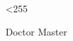 
\makeatletter
{}
\loop \catcode{} \ifnum\@tempcnta<255 \advance \@tempcnta \@ne
\repeat
\makeatother

\newif\ifxueweidoctor %
\newif\ifxueweimaster
\def\temp{Doctor}
\ifx\temp\xuewei
  \xueweidoctortrue  \xueweimasterfalse
\fi
\def\temp{Master}
\ifx\temp\xuewei
  \xueweidoctorfalse  \xueweimastertrue
\fi

\ifxueweidoctor
  \newcommand{\cxuewei}{博士}
  \newcommand{\exuewei}{Doctor}
  \newcommand{\exueweier}{Doctoral}
  \newcommand{\xueweishort}{博}
\fi

\ifxueweimaster
  \newcommand{\cxuewei}{硕士}
  \newcommand{\exuewei}{Master}
  \newcommand{\exueweier}{Master's}
  \newcommand{\xueweishort}{硕}
\fi